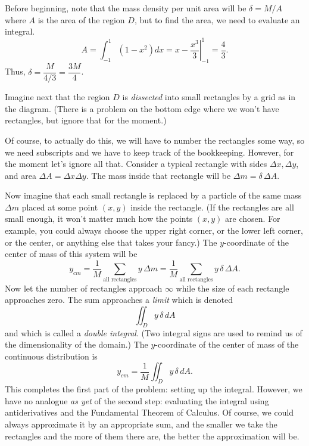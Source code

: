  Before beginning, note that the mass density per unit
area
will be $\delta = M/A$ where $A$ is the area of the region $D$, but
to find the
 area, we need to evaluate an integral.
$$
   A = \int_{-1}^1 (1 - x^2) dx = \left. x - \frac{x^3}3\right |_{-1}^1 = 
\frac 43.
$$
Thus, $\delta = \dfrac M{4/3} = \dfrac{3M}4$.  

Imagine next that the region $D$ is {\it dissected\/} into small
rectangles by a grid as in the diagram.  (There is a problem on
the bottom edge where we won't have rectangles, but ignore that
for the moment.)
\medskip
\centerline{}
\medskip
Of course, to actually do this, we will have to number the
rectangles some way, so we need subscripts and we have to
keep track of the bookkeeping.  However, for the moment let's
ignore all that.  Consider a typical rectangle with sides
$\Delta x, \Delta y$, and area $\Delta A = \Delta x\Delta y$.
The mass inside that rectangle will be $\Delta m = \delta\,\Delta A$.
\medskip
\centerline{}
\medskip
Now imagine that each small rectangle is replaced by a particle
of the same mass $\Delta m$ placed at some point
$(x,y)$ inside the rectangle. 
 (If the rectangles are all small enough, it won't matter
much how the points $(x,y)$ are chosen.  For example, you could
always choose the upper right corner, or  the
lower left corner, or the center, or anything
else that takes your fancy.)   The $y$-coordinate of the center
of mass of this system will be
$$
     y_{cm} = \frac 1M \sum_{\text{all rectangles}} y \,\Delta m
      = \frac 1M\sum_{\text{all rectangles}}y\, \delta\,\Delta A.
$$
Now let the number of rectangles approach $\infty$ while the
size of each rectangle approaches zero.   The sum approaches
a {\it limit\/} which is denoted
$$
      \iint_D y\,\delta\, dA
$$
and which is called a {\it double integral}. (Two integral
signs are used to remind us of the dimensionality of the
domain.)   The $y$-coordinate
of the center of mass of the continuous distribution is
$$
y_{cm} =   \frac 1M \iint_D y\,\delta\, dA.
$$
This completes the first part of the problem: setting
up the integral.   However, we have no analogue {\it as yet\/} of the
second step: evaluating the integral using antiderivatives
and the
Fundamental Theorem of Calculus.   Of course, we could always
%
approximate it by an appropriate sum, and the smaller we take
the rectangles and the more of them there are, the better the
approximation will be.

